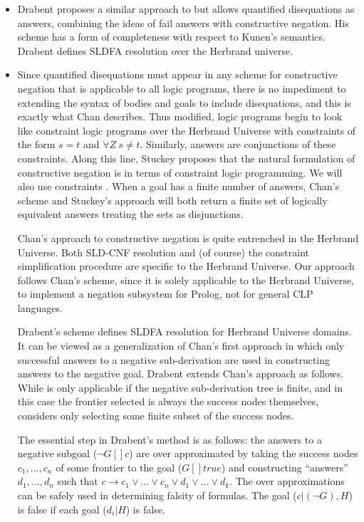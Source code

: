 \documentclass{tlp}
\newcommand{\where}{[\!]} %
\begin{document}
\begin{itemize}
\item Drabent \cite{Drabent} proposes a similar approach to
\cite{Malus} but allows quantified disequations as answers, combining
the ideas of fail answers with constructive negation. His scheme has a
form of completeness with respect to Kunen's semantics. Drabent
defines SLDFA resolution over the Herbrand universe.

\item Since quantified disequations must appear in any scheme for
constructive negation that is applicable to all logic programs, there
is no impediment to extending the syntax of bodies and goals to
include disequations, and this is exactly what Chan describes. Thus
modified, logic programs begin to look like constraint logic programs
over the Herbrand Universe with constraints of the form $s=t$ and
$\forall Z~ s \neq t$. Similarly, answers are conjunctions of these
constraints. Along this line, Stuckey \cite{Stuckey95} proposes that
the natural formulation of constructive negation is in terms of
constraint logic programming. We will also use constraints%
. When a goal has a finite
number of answers, Chan's scheme \cite{Chan1} and Stuckey's approach
\cite{Stuckey} will both return a finite set of logically equivalent
answers treating the sets as disjunctions.

Chan's approach to constructive negation is quite entrenched in the
Herbrand Universe. Both SLD-CNF resolution and (of course) the
constraint simplification procedure are specific to the Herbrand
Universe. Our approach follows Chan's scheme, since it is solely
applicable to the Herbrand Universe, to implement a negation subsystem
for Prolog, not for general CLP languages.

Drabent's scheme \cite{Drabent} defines SLDFA resolution for Herbrand
Universe domains. It can be viewed as a generalization of Chan's first
approach \cite{Chan1} in which only successful answers to a negative
sub-derivation are used in constructing answers to the negative
goal. Drabent extends Chan's approach as follows. While
\cite{Chan1} is only applicable if the negative sub-derivation tree is
finite, and in this case the frontier selected is always the success
nodes themselves, \cite{Drabent} considers only selecting some finite
subset of the success nodes.

The essential step in Drabent's method is as follows: the answers to a
negative subgoal ($\neg G \where c$) are over approximated by taking
the success nodes $c_1, ..., c_n$ of some frontier to the goal ($G
\where true$) and constructing ``answers'' $d_1, ..., d_n$ such that
$c \rightarrow c_1 \vee ... \vee c_n \vee d_1 \vee ... \vee d_k$. The
over approximations can be safely used in determining falsity of
formulas. The goal ($c | (\neg G), H$) is false if each goal ($d_i |
H$) is false.


\end{itemize}
\end{document}

